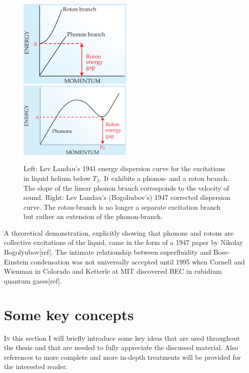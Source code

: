 \documentclass[12pt,a4paper]{book}
\begin{document}
		\begin{figure}[t]
			\begin{center}
				\includegraphics[width=0.495\textwidth]{phonon-roton-landau-first}
				\includegraphics[width=0.495\textwidth]{phonon-roton-bogoliubov}
			\end{center}
			\caption{Left: Lev Landau's 1941 energy dispersion curve for the excitations in liquid helium below $T_\lambda$. It exhibits a phonon- and a roton branch. The slope of the linear phonon branch corresponds to the velocity of sound. Right: Lev Landau's (Bogoliubov's) 1947 corrected dispersion curve. The roton-branch is no longer a separate excitation branch but rather an extension of the phonon-branch.}
			\label{fig:phonon-roton}
		\end{figure}

		A theoretical demonstration, explicitly showing that phonons and rotons are collective excitations of the liquid, came in the form of a 1947 paper by Nikolay Bogolyubov[ref]. The intimate relationship between superfluidity and Bose-Einstein condensation was not universally accepted until 1995 when Cornell and Wienman in Colorado and Ketterle at MIT discovered BEC in rubidium quantum gases[ref].
			
	\section{Some key concepts}
	\lettrine[lines=3,findent=3pt,nindent=0pt]{I}{n} this section I will briefly introduce some key ideas that are used throughout the thesis and that are needed to fully appreciate the discussed material. Also references to more complete and more in-depth treatments will be provided for the interested reader.
		
\end{document}

